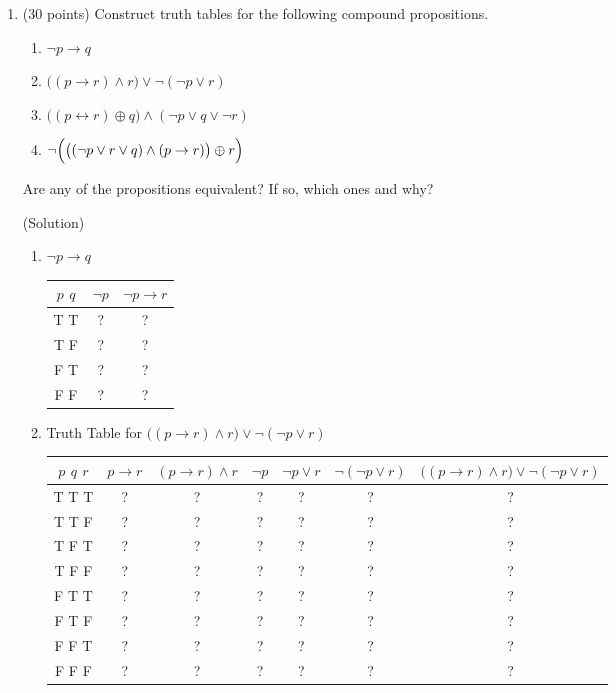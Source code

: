 \documentclass[letterpaper,12pt]{article}
\theoremstyle{plain}
\theoremstyle{definition}
\theoremstyle{remark}
\providecommand{\land}{\ensuremath{\wedge}}
\providecommand{\lor}{\ensuremath{\vee}}
\providecommand{\lxor}{\ensuremath{\oplus}}
\begin{document}
\pagestyle{fancy}


\begin{enumerate}
\item (30 points)
  Construct truth tables for the following compound propositions.
  \begin{enumerate}
    \item $\lnot p \to q$
  \item $\bigl((p \to r) \land r \bigr) \lor \lnot (\lnot p \lor r)$
  \item $\bigl((p \leftrightarrow r) \lxor q\bigr) \land (\lnot p \lor q \lor \lnot r)$
  \item $\lnot\Bigl( \bigl((\lnot p \lor r \lor q) \land (p \to r)\bigr) \lxor r\Bigr)$
  \end{enumerate}
  Are any of the propositions equivalent? If so, which ones and why?

 
(Solution) %
\begin{enumerate}
\item $\lnot p \to q$

\begin{center}
\begin{tabular}{ | c | c | c |} 
  \hline
 $p$ $q$ & $ \lnot p$ & $\lnot p \to r$ \\
 \hline
  T T & ? & ? \\ 
  T F & ? & ? \\ 
  F T & ? & ? \\
  F F & ? & ? \\
  \hline
\end{tabular}
\end{center}



\item Truth Table for $\bigl((p \to r) \land r \bigr) \lor \lnot (\lnot p \lor r)$
%
\begin{center}
\begin{tabular}{ | c | c | c | c | c | c | c |} 
  \hline
 $p$ $q$ $r$ & $p \to r$ & $(p \to r) \land r$ & $\lnot p$ & $\lnot p \lor r$ & $\lnot (\lnot p \lor r)$ & $\bigl((p \to r) \land r \bigr) \lor \lnot (\lnot p \lor r)$\\
  \hline
  T T T & ? & ? & ? & ? & ? & ?\\ 
  T T F & ? & ? & ? & ? & ? & ?\\ 
  T F T & ? & ? & ? & ? & ? & ?\\
  T F F & ? & ? & ? & ? & ? & ?\\
  F T T & ? & ? & ? & ? & ? & ?\\
  F T F & ? & ? & ? & ? & ? & ?\\
  F F T & ? & ? & ? & ? & ? & ?\\
  F F F & ? & ? & ? & ? & ? & ?\\
  \hline
\end{tabular}
\end{center}


\end{enumerate}
\end{enumerate}
\end{document}
